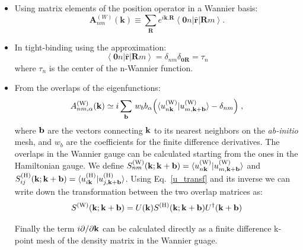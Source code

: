 \documentclass[preprint,showpacs,prb,superscriptaddress,aps,floatfix]{revtex4-1}
\newcommand{\bb}{{\bf b}}
\newcommand{\kk}{{\bf k}}
\newcommand{\be}{\begin{equation}}
\newcommand{\ee}{\end{equation}}
\renewcommand{\[}{\left[}
\renewcommand{\]}{\right]}
\renewcommand{\(}{\left(}
\renewcommand{\)}{\right)}
\def\pw{^{({\rm W})}}
\def\ph{^{({\rm H})}}
\begin{document}
\begin{itemize}
\item
Using matrix elements of the position operator in a Wannier basis:
\be
\boldsymbol{A}_{nm}^{(W)}\left(\boldsymbol{k}\right)  \equiv\sum_{\boldsymbol{R}}e^{i\boldsymbol{k}.\boldsymbol{R}}\left\langle \boldsymbol{0}n\left|\hat{\boldsymbol{r}}\right|\boldsymbol{R}m\right\rangle .\label{eq:Berry_connection_Wannier}
\ee
\item In tight-binding using the approximation:\cite{silva2019high}
\be
		\left\langle \boldsymbol{0}n\left|\hat{\boldsymbol{r}}\right|\boldsymbol{R}m\right\rangle=\delta_{nm}\delta_{\boldsymbol{0} \boldsymbol{R}} = \tau_n
\ee
where $\tau_n$ is the center of the n-Wannier function.
\item 
	From the overlaps of the eigenfunctions:\cite{wang2006ab}
	\begin{equation}
        A_{nm,\alpha}\pw(\kk)\simeq
        i\sum_\bb\,
        w_b b_{\alpha}\Big ( \langle u_{n\kk}\pw|u_{m,\kk+\bb}\pw
        \rangle
        - \delta_{nm}\Big )\;,
\label{eq:A_dis}
\end{equation}
%
where $\bb$ are the vectors connecting $\kk$ to its nearest
		neighbors on the {\it ab-initio} mesh, and $w_b$ are the coefficients for the finite difference derivatives. The overlaps in the Wannier gauge can be calculated starting from the ones in the Hamiltonian gauge. We define $S\pw_{nm}(\kk;\kk+\bb) =  \langle u_{n\kk}\pw|u_{m,\kk+\bb}\pw \rangle$ and $S\ph_{ij}(\kk;\kk+\bb) =  \langle u_{i\kk}\ph|u_{j,\kk+\bb}\ph \rangle$. Using Eq.~\ref{u_transf} and its inverse we can write down the transformation between the two overlap matrices as:
\be
		S\pw(\kk;\kk+\bb) = U(\kk) S\ph(\kk;\kk+\bb) U^\dagger(\kk+\bb)
\ee
 
Finally the term  $i {\partial}/{\partial \kk}$ can be calculated directly as a finite difference k-point mesh of the density matrix in the Wannier guage.
\end{itemize}
\end{document}
